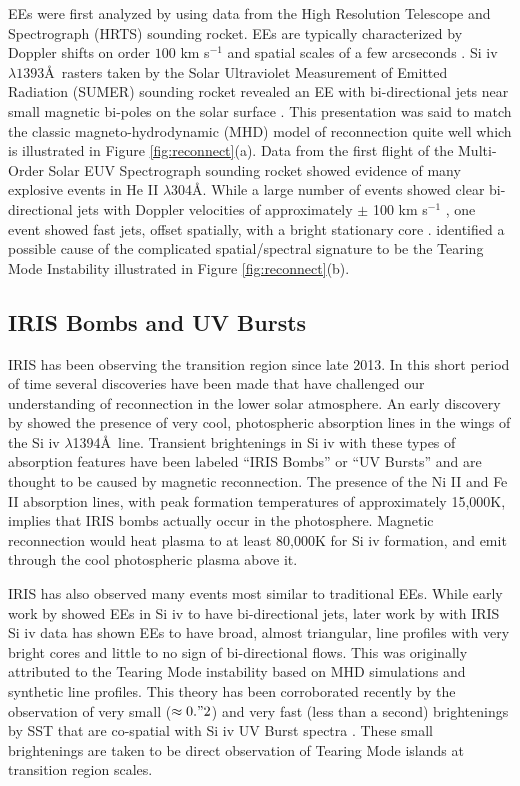 \documentclass[]{aastex6}
\begin{document}
	
	EEs were first analyzed by \citet{Brueckner1983} using data from the High Resolution Telescope and Spectrograph (HRTS) sounding rocket. EEs are typically characterized by Doppler shifts on order $100$ km s$^{-1}$ and spatial scales of a few arcseconds \citep{Dere1989,Dere1994}.  Si {\sc iv} $\lambda 1393$\AA\ rasters taken by the Solar Ultraviolet Measurement of Emitted Radiation (SUMER) sounding rocket revealed an EE with bi-directional jets near small magnetic bi-poles on the solar surface \citep{Innes1997}.  This presentation was said to match the classic magneto-hydrodynamic (MHD) model of reconnection \citep{Petschek1964} quite well which is illustrated in Figure \ref{fig:reconnect}(a). Data from the first flight of the Multi-Order Solar EUV Spectrograph \citep[MOSES;][]{Fox2010} sounding rocket showed evidence of many explosive events in He II $\lambda$304\AA. While a large number of events showed clear bi-directional jets with Doppler velocities of approximately $\pm$ 100 km s$^{-1}$ \citep{Rust2017}, one event showed fast jets, offset spatially, with a bright stationary core \citep{Fox2010}.  \citet{Fox2010} identified a possible cause of the complicated spatial/spectral signature to be the Tearing Mode Instability \citep{Furth1963} illustrated in Figure \ref{fig:reconnect}(b).
	
	\subsection{IRIS Bombs and UV Bursts}
	IRIS has been observing the transition region since late 2013.  In this short period of time several discoveries have been made that have challenged our understanding of reconnection in the lower solar atmosphere.  An early discovery by \citet{Peter2014} showed the presence of very cool, photospheric absorption lines in the wings of the Si {\sc iv} $\lambda$1394\AA\ line. Transient brightenings in Si {\sc iv} with these types of absorption features have been labeled ``IRIS Bombs'' or ``UV Bursts'' and are thought to be caused by magnetic reconnection. The presence of the Ni II and Fe II absorption lines, with peak formation temperatures of approximately 15,000K, implies that IRIS bombs actually occur in the photosphere.  Magnetic reconnection would heat plasma to at least 80,000K for Si {\sc iv} formation, and emit through the cool photospheric plasma above it.
	
	IRIS has also observed many events most similar to traditional EEs.  While early work by \citet{Innes1997} showed EEs in Si {\sc iv} to have bi-directional jets, later work by \citet{Innes2015} with IRIS Si {\sc iv} data has shown EEs to have broad, almost triangular, line profiles with very bright cores and little to no sign of bi-directional flows.  This was originally attributed to the Tearing Mode instability based on MHD simulations and synthetic line profiles. This theory has been corroborated recently by the observation of very small ($\approx 0."2$) and very fast (less than a second) brightenings by SST that are co-spatial with Si {\sc iv} UV Burst spectra \citep{Rouppe2017}.  These small brightenings are taken to be direct observation of Tearing Mode islands at transition region scales.
	
\end{document}
